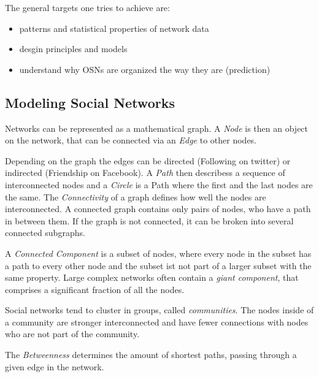 The general targets one tries to achieve are:\\
\begin{itemize}
	\item patterns and statistical properties of network data
	\item desgin principles and models
	\item understand why OSNs are organized the way they are (prediction)
\end{itemize}

\subsection{Modeling Social Networks} %
\label{sub:modeling_social_networks}
Networks can be represented as a mathematical graph.
A \emph{Node} is then an object on the network,
that can be connected via an \emph{Edge} to other nodes.

Depending on the graph the edges can be directed (Following on twitter)
or indirected (Friendship on Facebook).
A \emph{Path} then describess a sequence of interconnected nodes
and a \emph{Circle} is a Path where the first and the last nodes are the same.
The \emph{Connectivity} of a graph defines how well the nodes are interconnected.
A connected graph contains only pairs of nodes,
who have a path in between them.
If the graph is not connected,
it can be broken into several connected subgraphs.

A \emph{Connected Component} is a subset of nodes,
where every node in the subset has a path to every other node
and the subset ist not part of a larger subset with the same property.
Large complex networks often contain a \emph{giant component},
that comprises a significant fraction of all the nodes.

Social networks tend to cluster in groups,
called \emph{communities}.
The nodes inside of a community are stronger interconnected
and have fewer connections with nodes who are not part of the community.

The \emph{Betweenness} determines the amount of shortest paths,
passing through a given edge in the network.
